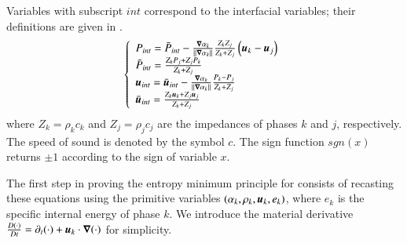 \documentclass[preprint,10pt]{elsarticle}
\begin{document}
{\begin{appendices}
Variables with subscript ${int}$ correspond to the interfacial variables; their definitions are given in . 
\begin{equation}
\label{eq:sev_equ2-app}
\left\{
\begin{array}{lll}
P_{int} = \bar{P}_{int} - \frac{\boldsymbol\nabla \alpha_k}{|| \boldsymbol\nabla \alpha_k ||} \frac{Z_k Z_j}{Z_k + Z_j} \left( \boldsymbol u_k-\boldsymbol u_j \right) \\
\bar{P}_{int} = \frac{Z_k P_j + Z_j P_k}{Z_k + Z_j} \\
\boldsymbol u_{int} = \bar{\boldsymbol u}_{int} - \frac{\boldsymbol\nabla \alpha_k}{|| \boldsymbol\nabla \alpha_k ||} \frac{P_k - P_j}{Z_k + Z_j} \\
\bar{\boldsymbol u}_{int} = \frac{Z_k \boldsymbol u _k + Z_j \boldsymbol u_j}{Z_k + Z_j}
\end{array}
\right.
\end{equation}
where $Z_k = \rho_k c_k$ and $Z_j = \rho_j c_j$ are the impedances of phases $k$ and $j$, respectively. The speed of sound is denoted by the symbol $c$. The sign function $sgn(x)$ returns $\pm 1$ according to the sign of variable $x$.

The first step in proving the entropy minimum principle for  
consists of recasting these equations using the primitive variables $(\alpha_k, \rho_k, \boldsymbol u_k, e_k)$, where $e_k$ is the specific internal energy of phase $k$. We introduce the material derivative $\frac{D (\cdot)}{Dt} = \partial_t (\cdot) + \boldsymbol u_k \cdot \boldsymbol\nabla (\cdot)$ for simplicity. 


\end{appendices}}
\end{document}
